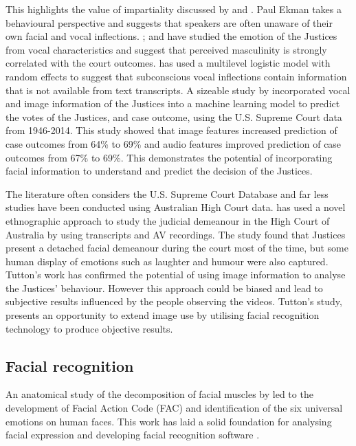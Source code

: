 \documentclass{monashthesis}
\begin{document}
This highlights the value of impartiality discussed by \textcite{tutton2018judicial} and \textcite{goffman1956nature}.
Paul Ekman \textcite{ekman1991invited} takes a behavioural perspective and suggests that speakers are often unaware of their own facial and vocal inflections. \textcite{chen2016perceived}; \textcite{chen2017covering} and \textcite{schubert1992observing} have studied the emotion of the Justices from vocal characteristics and suggest that perceived masculinity is strongly correlated with the court outcomes. \textcite{dietrich2019emotional} has used a multilevel logistic model with random effects to suggest that subconscious vocal inflections contain information that is not available from text transcripts.
A sizeable study by \textcite{chen2018justice} incorporated vocal and image information of the Justices into a machine learning model to predict the votes of the Justices, and case outcome, using the U.S. Supreme Court data from 1946-2014. This study showed that image features increased prediction of case outcomes from 64\% to 69\% and audio features improved prediction of case outcomes from 67\% to 69\%. This demonstrates the potential of incorporating facial information to understand and predict the decision of the Justices.

The literature often considers the U.S. Supreme Court Database and far less studies have been conducted using Australian High Court data. \textcite{tutton2018judicial} has used a novel ethnographic approach to study the judicial demeanour in the High Court of Australia by using transcripts and AV recordings. The study found that Justices present a detached facial demeanour during the court most of the time, but some human display of emotions such as laughter and humour were also captured. Tutton's \autocite*{tutton2018judicial} work has confirmed the potential of using image information to analyse the Justices' behaviour. However this approach could be biased and lead to subjective results influenced by the people observing the videos. Tutton's \autocite*{tutton2018judicial} study, presents an opportunity to extend image use by utilising facial recognition technology to produce objective results.

\hypertarget{facial-recognition}{%
\subsection{Facial recognition}\label{facial-recognition}}

An anatomical study of the decomposition of facial muscles by \autocite{ekman1976measuring} led to the development of Facial Action Code (FAC) \autocite{ekman1978} and identification of the six universal emotions on human faces. This work has laid a solid foundation for analysing facial expression and developing facial recognition software \autocites{Kobayashi1992}{huang1997}{lien2000}{Kappoor2003}{Tong2007}{Cohn2009}{Lucey2010}.
\end{document}
